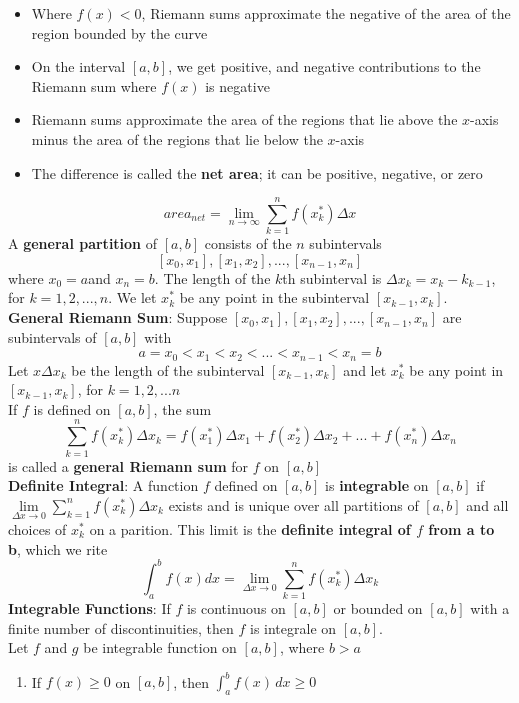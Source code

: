 \documentclass{article}
\begin{document}
\begin{itemize}
\begin{itemize}
        \item Where $f(x) < 0$, Riemann sums approximate the negative of the area of the region bounded by the curve
        \item On the interval $[a,b]$, we get positive, and negative contributions to the Riemann sum where $f(x)$ is negative
        \item Riemann sums approximate the area of the regions that lie above the $x$-axis minus the area of the regions that lie below the $x$-axis
        \item The difference is called the \textbf{net area}; it can be positive, negative, or zero
    \end{itemize}
    $$area_{net} = \lim_{n \to \infty}{\sum_{k = 1}^{n}{f(x_k^*)\Delta{x}}}$$
    A \textbf{general partition} of $[a,b]$ consists of the $n$ subintervals
    $$[x_0,x_1],[x_1,x_2],...,[x_{n - 1}, x_n]$$
    where $x_0 = a$and $x_n = b$. The length of the $k$th subinterval is $\Delta{x_k} = x_k - k_{k-1}$, for $k = 1,2,...,n$. We let $x_k^*$ be any point in the subinterval $[x_{k - 1}, x_k]$. \\
    \textbf{General Riemann Sum}: Suppose $[x_0,x_1],[x_1, x_2],...,[x_{n - 1}, x_n]$ are subintervals of $[a,b]$ with
    $$a = x_0 < x_1 < x_2 < ... < x_{n - 1} < x_n = b$$
    Let $x\Delta{x_k}$ be the length of the subinterval $[x_{k - 1}, x_k]$ and let $x_k^*$ be any point in $[x_{k - 1}, x_k]$, for $k = 1,2,...n$ \\
    If $f$ is defined on $[a,b]$, the sum
    $$\sum_{k = 1}^{n}{f(x_k^*)\Delta{x_k}} = f(x_1^*)\Delta{x_1} + f(x_2^*)\Delta{x_2} + ... + f(x_n^*)\Delta{x_n}$$
    is called a \textbf{general Riemann sum} for $f$ on $[a,b]$ \\
    \textbf{Definite Integral}: A function $f$ defined on $[a,b]$ is \textbf{integrable} on $[a,b]$ if $\lim\limits_{\Delta{x} \to 0}{\sum\limits_{k = 1}^{n}{f(x_k^*)\Delta{x_k}}}$ exists and is unique over all partitions of $[a,b]$ and all choices of $x_k^*$ on a parition. This limit is the \textbf{definite integral of $f$ from a to b}, which we rite
    $$\int_a^b{f(x)dx} = \lim_{\Delta{x} \to 0}{\sum_{k = 1}^{n}{f(x_k^*)\Delta{x_k}}}$$
    \textbf{Integrable Functions}: If $f$ is continuous on $[a,b]$ or bounded on $[a,b]$ with a finite number of discontinuities, then $f$ is integrale on $[a,b]$. \\
    Let $f$ and $g$ be integrable function on $[a,b]$, where $b > a$
    \begin{enumerate}
        \item If $f(x) \geq 0$ on $[a,b]$, then $\int_a^b{f(x)\,dx} \geq 0$

\end{enumerate}
\end{itemize}
\end{document}
